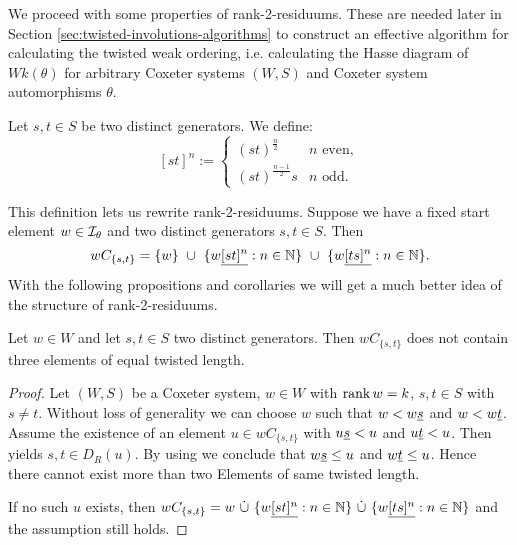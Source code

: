 We proceed with some properties of rank-2-residuums. These are needed later in Section \ref{sec:twisted-involutions-algorithms} to construct an effective algorithm for calculating the twisted weak ordering, i.e. calculating the Hasse diagram of $Wk(\theta)$ for arbitrary Coxeter systems $(W,S)$ and Coxeter system automorphisms $\theta$.

\begin{defi}
	Let $s,t \in S$ be two distinct generators. We define:
	$$[st]^n :=
	\begin{cases}
	(st)^{\frac{n}{2}} & n \textrm{ even}, \\
	(st)^{\frac{n-1}{2}}s & n \textrm{ odd}. 
	\end{cases}$$
\end{defi}

This definition lets us rewrite rank-2-residuums. Suppose we have a fixed start element $w \in \mathcal{I}_{\theta}$ and two distinct generators $s,t \in S$. Then
$$ wC_{\{s,t\}} = \{ w \} \ \cup \ \{ w \underline{[st]^n} : n \in \mathbb{N} \} \ \cup \ \{ w \underline{[ts]^n} : n \in \mathbb{N} \}. $$
With the following propositions and corollaries we will get a much better idea of the structure of rank-2-residuums.

\begin{prop}
	\todo
	Let $w \in W$ and let $s,t \in S$ two distinct generators. Then $wC_{\{s,t\}}$ does not contain three elements of equal twisted length.

	\begin{proof}
		Let $(W,S)$ be a Coxeter system, $w \in W$ with $\operatorname{rank} w = k$, $s, t \in S$ with $s \neq t$. Without loss of generality we can choose $w$ such that $w < w \underline{s}$ and $w < w \underline{t}$. Assume the existence of an element $u \in wC_{\{s,t\}}$ with $u \underline{s} < u$ and $u \underline{t} < u$. Then \cite[Lemma 3.8]{hultman:comb-twisted-invo} yields $s,t \in D_R(u)$. By using \cite[Lemma 3.9]{hultman:comb-twisted-invo} we conclude that $w \underline{s} \leq u$ and $w \underline{t} \leq u$. Hence there cannot exist more than two Elements of same twisted length.

		If no such $u$ exists, then $wC_{\{s,t\}} = w \ \dot \cup \ \{ w \ul{[st]^n} : n \in \nn \} \ \dot \cup \ \{ w \ul{[ts]^n} : n \in \nn \}$ and the assumption still holds.
	\end{proof}
\end{prop}

